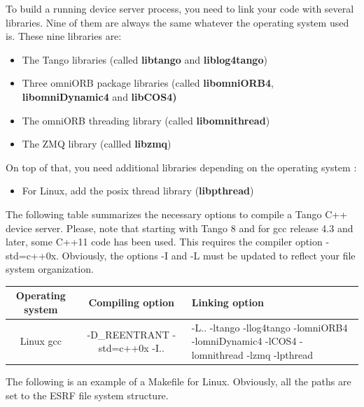 To build a running device server process, you need to link your code
with several libraries. Nine of them are always the same whatever
the operating system used is. These nine libraries are:
\begin{itemize}
\item The Tango libraries (called \textbf{libtango} and \textbf{liblog4tango})
\item Three omniORB package libraries (called \textbf{libomniORB4},
\textbf{libomniDynamic4} and \textbf{libCOS4)}
\item The omniORB threading library (called \textbf{libomnithread})
\item The ZMQ library (callled \textbf{libzmq})
\end{itemize}
On top of that, you need additional libraries depending on the operating
system :
\begin{itemize}
\item For Linux, add the posix thread library (\textbf{libpthread})
\end{itemize}
The following table summarizes the necessary options to compile a
Tango C++ device server. Please, note that starting with Tango 8 and
for gcc release 4.3 and later, some C++11 code has been
used. This requires the compiler option \textquotedbl{}-std=c++0x\textquotedbl{}.
Obviously, the options -I and -L must be updated to reflect your file
system organization. 

\vspace{0.3cm}


\begin{center}
\begin{longtable}{|c|c|m{70mm}|}
\hline 
Operating system & Compiling option & Linking option\tabularnewline
\hline 
\hline 
Linux gcc & -D\_REENTRANT -std=c++0x -I.. & -L.. -ltango -llog4tango -lomniORB4 -lomniDynamic4 -lCOS4 -lomnithread
-lzmq -lpthread\tabularnewline
\hline 
\end{longtable}
\par\end{center}

\vspace{0.3cm}


The following is an example of a Makefile for Linux. Obviously, all
the paths are set to the ESRF file system structure.

